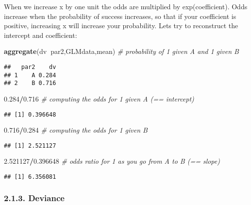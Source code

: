 \documentclass[
]{article}
\newenvironment{Shaded}{\begin{snugshade}}{\end{snugshade}}
\newcommand{\CommentTok}[1]{\textcolor[rgb]{0.56,0.35,0.01}{\textit{#1}}}
\newcommand{\FloatTok}[1]{\textcolor[rgb]{0.00,0.00,0.81}{#1}}
\newcommand{\KeywordTok}[1]{\textcolor[rgb]{0.13,0.29,0.53}{\textbf{#1}}}
\newcommand{\NormalTok}[1]{#1}
\newcommand{\OperatorTok}[1]{\textcolor[rgb]{0.81,0.36,0.00}{\textbf{#1}}}
\begin{document}
When we increase x by one unit the odds are multiplied by
exp(coefficient). Odds increase when the probability of success
increases, so that if your coefficient is positive, increasing x will
increase your probability. Lets try to reconstruct the intercept and
coefficient:

\begin{Shaded}
\begin{Highlighting}[]
\KeywordTok{aggregate}\NormalTok{(dv}\OperatorTok{~}\NormalTok{par2,GLMdata,mean) }\CommentTok{# probability of 1 given A and 1 given B}
\end{Highlighting}
\end{Shaded}

\begin{verbatim}
##   par2    dv
## 1    A 0.284
## 2    B 0.716
\end{verbatim}

\begin{Shaded}
\begin{Highlighting}[]
\FloatTok{0.284}\OperatorTok{/}\FloatTok{0.716} \CommentTok{# computing the odds for 1 given A (== intercept)}
\end{Highlighting}
\end{Shaded}

\begin{verbatim}
## [1] 0.396648
\end{verbatim}

\begin{Shaded}
\begin{Highlighting}[]
\FloatTok{0.716}\OperatorTok{/}\FloatTok{0.284} \CommentTok{# computing the odds for 1 given B}
\end{Highlighting}
\end{Shaded}

\begin{verbatim}
## [1] 2.521127
\end{verbatim}

\begin{Shaded}
\begin{Highlighting}[]
\FloatTok{2.521127}\OperatorTok{/}\FloatTok{0.396648} \CommentTok{# odds ratio for 1 as you go from A to B (== slope)}
\end{Highlighting}
\end{Shaded}

\begin{verbatim}
## [1] 6.356081
\end{verbatim}

\hypertarget{deviance}{%
\subsubsection{2.1.3. Deviance}\label{deviance}}
\end{document}
